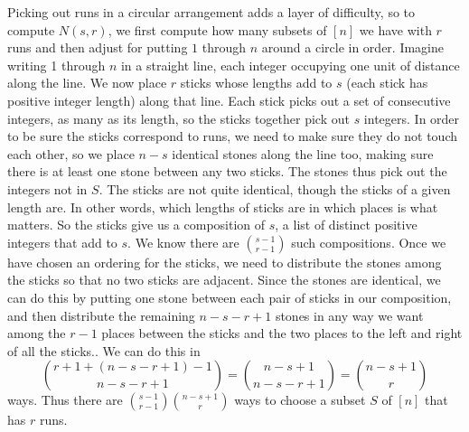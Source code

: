 {Picking out runs in a circular arrangement adds a layer of difficulty, so to
compute $N(s,r)$, we first compute how many subsets of $[n]$ we have with $r$
runs and then adjust for putting $1$ through $n$ around a circle in order.
Imagine writing 1 through
$n$ in a straight line, each integer occupying one unit of distance along the
line. We now place
$r$  sticks whose lengths add to
$s$ (each stick has positive integer length) along that line. Each stick
picks out a set of consecutive integers, as many as its length, so the
sticks together pick out $s$ integers.  In order to be sure the sticks
correspond to runs, we need to make sure they do not touch each other, so we
place $n-s$ identical stones along the line too, making sure there is at
least one stone between any two sticks.  The stones thus pick out the integers
not in $S$.  The sticks are not quite identical, though the sticks of a given
length are.  In other words, which lengths of sticks are in which places is
what matters.  So the sticks give us a composition of $s$, a list of distinct
positive integers that add to $s$.  We know there are $s-1\choose r-1$ such
compositions. Once we have chosen an ordering for the sticks, we need to
distribute the stones among the sticks so that no two sticks are adjacent. 
Since the stones are identical, we can do this by putting one stone between
each pair of sticks in our composition, and then distribute the remaining
$n-s-r+1$  stones in any way we want among the $r-1$ places between the sticks
and the two places to the left and right of all the sticks..  We can do this in
$${r+1 + (n-s-r+1)-1\choose n-s-r+1}={n-s+1\choose n-s-r+1}={n-s+1\choose r}$$
ways. Thus there are
${s-1\choose r-1}{n-s+1\choose r}$ ways to choose a subset $S$ of $[n]$ that
has
$r$ runs.

}
